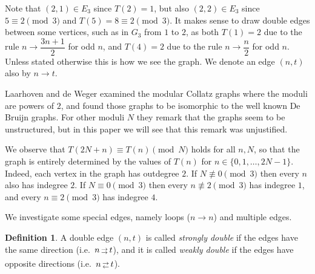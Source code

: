 \documentclass[10pt]{article}
\makeatletter
\theoremstyle{definition}
\newtheorem{definition}{Definition}
\newcommand{\myrightarrow}{{\scriptstyle\rightarrow}}
\newcommand{\myleftarrow}{{\scriptstyle\leftarrow}}
\newcommand{\rrarrow}{\begin{array}{@{\,}c@{\,}} \myrightarrow \\[-8pt] \myrightarrow \end{array}}
\newcommand{\rlarrow}{\begin{array}{@{\,}c@{\,}} \myrightarrow \\[-8pt] \myleftarrow \end{array}}
\makeatother
\begin{document}
Note that $ (2,1) \in E_3 $ since $ T(2) = 1 $, but also $ (2,2) \in E_3 $ since $ 5 \equiv 2 \pmod{3} $
and $ T(5) = 8 \equiv 2 \pmod{3} $. It makes sense to draw double edges between some vertices, such as in
$ G_3 $ from $ 1 $ to $ 2 $, as both $ T(1) = 2 $ due to the rule $ n \to \dfrac{3n+1}{2} $ for odd
$ n $, and $ T(4) = 2 $ due to the rule $ n \to \dfrac{n}{2} $ for odd $ n $. Unless stated otherwise
this is how we see the graph. We denote an edge $ (n,t) $ also by $ n \to t $.

Laarhoven and de Weger \cite{LdW} examined the modular Collatz graphs where the moduli are powers of
$ 2 $, and found those graphs to be isomorphic to the well known De Bruijn graphs. For other moduli
$ N $ they remark that the graphs seem to be unstructured, but in this paper we will see that this
remark was unjustified.

We observe that $ T(2N+n) \equiv T(n) \pmod{N} $ holds for all $ n, N $, so that the graph is entirely
determined by the values of $ T(n) $ for $ n \in \{ 0, 1, \ldots, 2N-1 \} $. Indeed, each vertex in
the graph has outdegree $ 2 $. If $ N \not\equiv 0 \pmod{3} $ then every $ n $ also has indegree $ 2 $.
If $ N \equiv 0 \pmod{3} $ then every $ n \not\equiv 2 \pmod{3} $ has indegree $ 1 $, and every
$ n \equiv 2 \pmod{3} $ has indegree $ 4 $.

We investigate some special edges, namely loops ($ n \to n $) and multiple edges.

\begin{definition} \label{def:doubleedges}
    A double edge $ (n,t) $ is called \emph{strongly double} if the edges have the same direction (i.e.\
    $ n \rrarrow t $), and it is called \emph{weakly double} if the edges have opposite directions (i.e.\
    $ n \rlarrow t $).
\end{definition}
\end{document}
